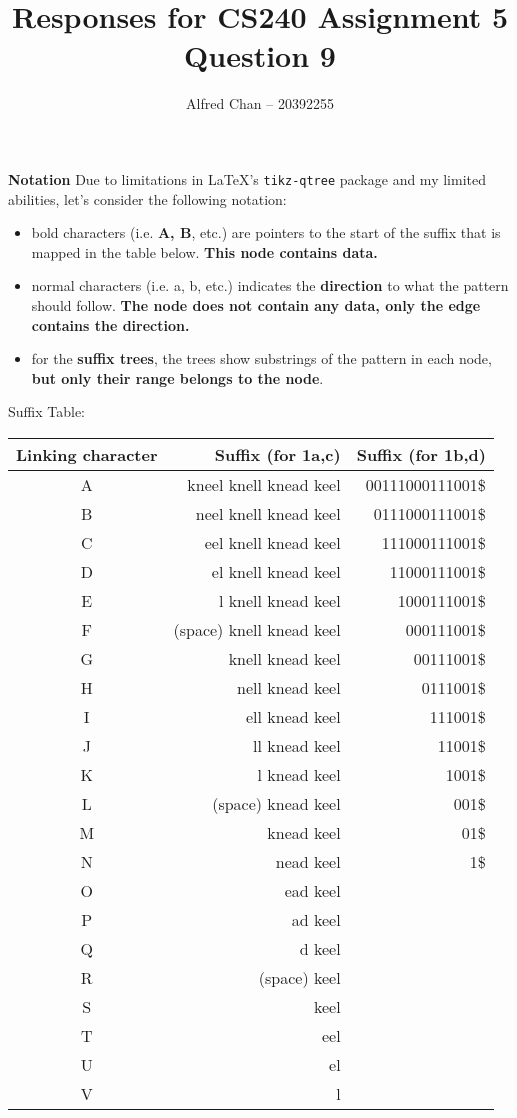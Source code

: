\documentclass[12pt]{article}
\title{Responses for CS240 Assignment 5 Question 9}
\author{Alfred Chan -- 20392255}
\begin{document}
\maketitle
{\bf Notation} Due to limitations in \LaTeX's \texttt{tikz-qtree} package and my limited abilities, let's consider the following notation:
\begin{itemize}
\item bold characters (i.e. {\bf A, B}, etc.) are pointers to the start of the suffix that is mapped in the table below. {\bf This node contains data.}
\item normal characters (i.e. a, b, etc.) indicates the {\bf direction} to what the pattern should follow. {\bf The node does not contain any data, only the edge contains the direction.}
\item for the {\bf suffix trees}, the trees show substrings of the pattern in each node, {\bf but only their range belongs to the node}.
\end{itemize}

Suffix Table:\\
\begin{tabular}{c|r|r}
Linking character & Suffix (for 1a,c) & Suffix (for 1b,d)\\\hline
A & kneel knell knead keel		& 00111000111001\$\\\hline
B & neel knell knead keel			& 0111000111001\$\\\hline
C & eel knell knead keel			& 111000111001\$\\\hline
D & el knell knead keel				& 11000111001\$\\\hline
E & l knell knead keel				& 1000111001\$\\\hline
F & (space) knell knead keel	& 000111001\$\\\hline
G & knell knead keel					& 00111001\$\\\hline
H & nell knead keel						& 0111001\$\\\hline
I & ell knead keel						& 111001\$\\\hline
J & ll knead keel							& 11001\$\\\hline
K & l knead keel							& 1001\$\\\hline
L & (space) knead keel				& 001\$\\\hline
M & knead keel								& 01\$\\\hline
N & nead keel									& 1\$\\\hline
O & ead keel\\\hline
P & ad keel\\\hline
Q & d keel\\\hline
R & (space) keel\\\hline
S & keel\\\hline
T & eel\\\hline
U & el\\\hline
V & l\\\hline
\end{tabular}\\
\end{document}
